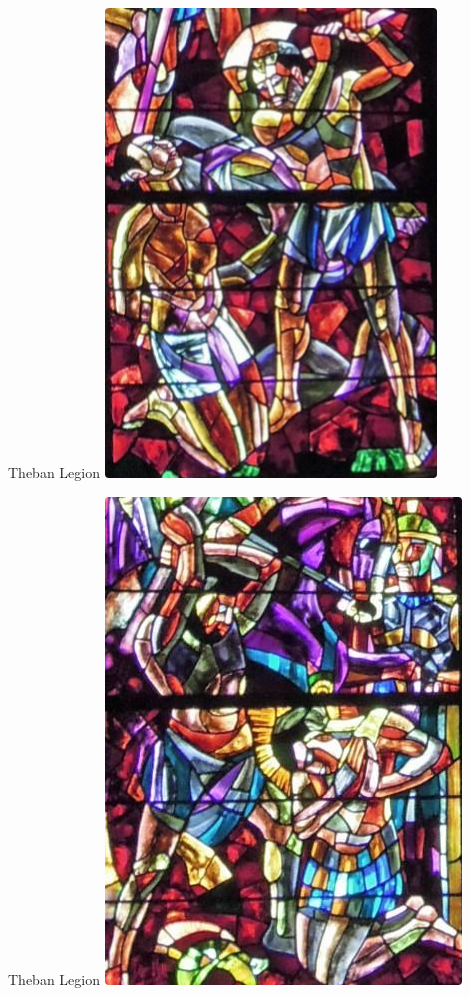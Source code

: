 \begin{frame}{Theban Legion}
    \centering
    \includegraphics[height=0.7\textheight]{img/theban-sample2.png} \\
\end{frame}

\begin{frame}{Theban Legion}
    \centering
    \includegraphics[height=0.7\textheight]{img/theban-sample3.png} \\
\end{frame}

